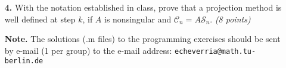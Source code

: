\documentclass[10pt]{report}
\begin{document}
\begin{enumerate}
\item[\textbf{4.}] With the notation established in class, prove that a projection method is well defined at step $k$, if $A$ is nonsingular and $\mathcal{C}_n=A\mathcal{S}_n$. \textit{(8 points)}



%
%

\vspace{3cm} 

\item[\textbf{Note.}] The solutions (.m files) to the programming exercises should be sent by e-mail (1 per group) to the e-mail address: \verb+echeverria@math.tu-berlin.de+ \\


\end{enumerate}
\end{document}
